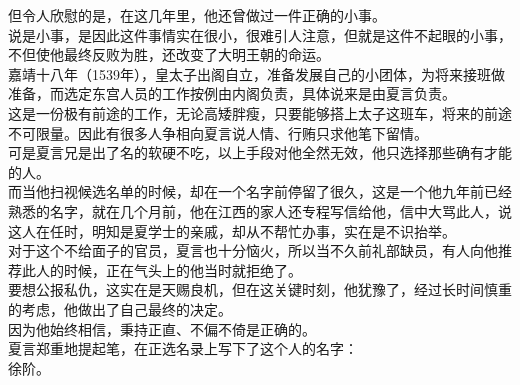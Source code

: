 \begin{multicols}{\theparacolNo}
但令人欣慰的是，在这几年里，他还曾做过一件正确的小事。\\

说是小事，是因此这件事情实在很小，很难引人注意，但就是这件不起眼的小事，不但使他最终反败为胜，还改变了大明王朝的命运。\\

嘉靖十八年（1539年），皇太子出阁自立，准备发展自己的小团体，为将来接班做准备，而选定东宫人员的工作按例由内阁负责，具体说来是由夏言负责。\\

这是一份极有前途的工作，无论高矮胖瘦，只要能够搭上太子这班车，将来的前途不可限量。因此有很多人争相向夏言说人情、行贿只求他笔下留情。\\

可是夏言兄是出了名的软硬不吃，以上手段对他全然无效，他只选择那些确有才能的人。\\

而当他扫视候选名单的时候，却在一个名字前停留了很久，这是一个他九年前已经熟悉的名字，就在几个月前，他在江西的家人还专程写信给他，信中大骂此人，说这人在任时，明知是夏学士的亲戚，却从不帮忙办事，实在是不识抬举。\\

对于这个不给面子的官员，夏言也十分恼火，所以当不久前礼部缺员，有人向他推荐此人的时候，正在气头上的他当时就拒绝了。\\

要想公报私仇，这实在是天赐良机，但在这关键时刻，他犹豫了，经过长时间慎重的考虑，他做出了自己最终的决定。\\

因为他始终相信，秉持正直、不偏不倚是正确的。\\

夏言郑重地提起笔，在正选名录上写下了这个人的名字：\\

徐阶。\\
\ifnum{}
	\end{multicols}
\fi
\newpage
